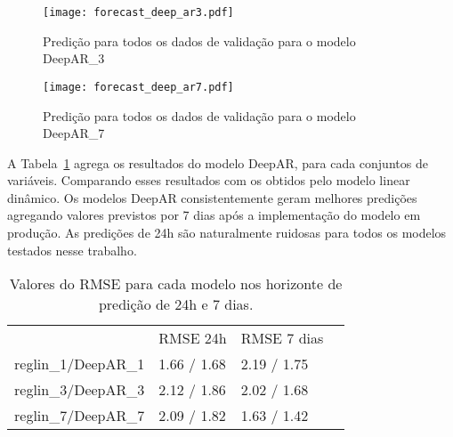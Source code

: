 \begin{figure}[H]
  \centering
  \texttt{[image: forecast\_deep\_ar3.pdf]} 
  \caption{Predição para todos os dados de validação para o modelo DeepAR\_3}
  \label{fig:fordeepar3}
\end{figure}

\begin{figure}[H]
  \centering
  \texttt{[image: forecast\_deep\_ar7.pdf]} 
  \caption{Predição para todos os dados de validação para o modelo DeepAR\_7}
  \label{fig:fordeepar7}
\end{figure}


A Tabela~\ref{tb:rmsedeepar} agrega os resultados do modelo DeepAR, para cada
conjuntos de variáveis. Comparando esses resultados com os obtidos pelo modelo
linear dinâmico. Os modelos DeepAR consistentemente geram melhores predições agregando valores previstos por 7 dias
após a implementação do modelo em produção. As predições de 24h são naturalmente
ruidosas para todos os modelos testados nesse trabalho.

\begin{center}
\begin{table}[]
  \centering
  \begin{tabular}{l|lll}
    \cline{2-3}
    & \multicolumn{1}{l|}{RMSE 24h} & \multicolumn{1}{l|}{RMSE 7 dias} &  \\ \cline{1-3}
    \multicolumn{1}{|l|}{reglin\_1/DeepAR\_1} & 1.66 / 1.68                   & 2.19 / 1.75                      &  \\ \cline{1-1}
    \multicolumn{1}{|l|}{reglin\_3/DeepAR\_3} & 2.12 / 1.86                   & 2.02 / 1.68                      &  \\ \cline{1-1}
    \multicolumn{1}{|l|}{reglin\_7/DeepAR\_7} & 2.09 / 1.82                   & 1.63 / 1.42                      &  \\ \cline{1-1}
  \end{tabular}
  \caption{Valores do RMSE para cada modelo nos horizonte de predição de 24h e 7 dias.}
\label{tb:rmsedeepar}
\end{table}
\end{center}
